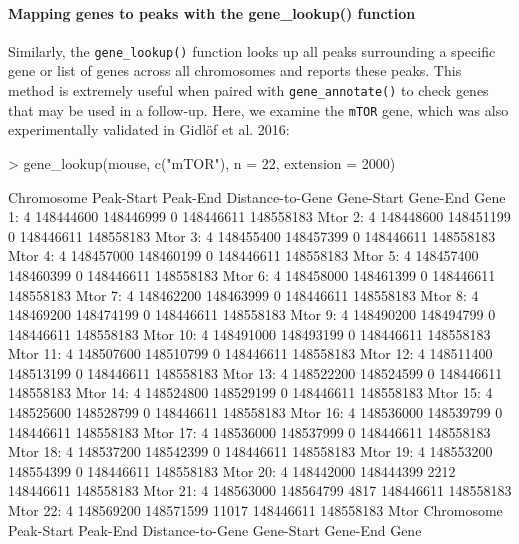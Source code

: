 \documentclass[12pt]{article}
\begin{document}
\paragraph{Mapping genes to peaks with the gene\_lookup() function}

Similarly, the \texttt{gene\_lookup()} function looks up all peaks surrounding a specific gene or list of genes across all chromosomes and reports these peaks. This method is extremely useful when paired with \texttt{gene\_annotate()} to check genes that may be used in a follow-up.  Here, we examine the \texttt{mTOR} gene, which was also experimentally validated in Gidl\"{o}f et al. 2016:

\begin{Schunk}
\begin{Sinput}
> gene_lookup(mouse, c("mTOR"), n = 22, extension = 2000)
\end{Sinput}
\begin{Soutput}
    Chromosome Peak-Start  Peak-End Distance-to-Gene Gene-Start  Gene-End Gene
 1:          4  148444600 148446999                0  148446611 148558183 Mtor
 2:          4  148448600 148451199                0  148446611 148558183 Mtor
 3:          4  148455400 148457399                0  148446611 148558183 Mtor
 4:          4  148457000 148460199                0  148446611 148558183 Mtor
 5:          4  148457400 148460399                0  148446611 148558183 Mtor
 6:          4  148458000 148461399                0  148446611 148558183 Mtor
 7:          4  148462200 148463999                0  148446611 148558183 Mtor
 8:          4  148469200 148474199                0  148446611 148558183 Mtor
 9:          4  148490200 148494799                0  148446611 148558183 Mtor
10:          4  148491000 148493199                0  148446611 148558183 Mtor
11:          4  148507600 148510799                0  148446611 148558183 Mtor
12:          4  148511400 148513199                0  148446611 148558183 Mtor
13:          4  148522200 148524599                0  148446611 148558183 Mtor
14:          4  148524800 148529199                0  148446611 148558183 Mtor
15:          4  148525600 148528799                0  148446611 148558183 Mtor
16:          4  148536000 148539799                0  148446611 148558183 Mtor
17:          4  148536000 148537999                0  148446611 148558183 Mtor
18:          4  148537200 148542399                0  148446611 148558183 Mtor
19:          4  148553200 148554399                0  148446611 148558183 Mtor
20:          4  148442000 148444399             2212  148446611 148558183 Mtor
21:          4  148563000 148564799             4817  148446611 148558183 Mtor
22:          4  148569200 148571599            11017  148446611 148558183 Mtor
    Chromosome Peak-Start  Peak-End Distance-to-Gene Gene-Start  Gene-End Gene
\end{Soutput}
\end{Schunk}
\end{document}
